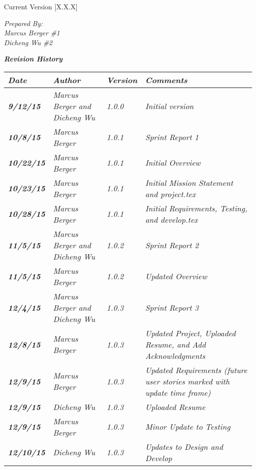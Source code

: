 


Current Version [X.X.X]
\vspace*{5mm}

{\color{SDColor5}
\noindent
\textit{Prepared By:}\\
\textit{Marcus Berger \#1}\\
\textit{Dicheng Wu \#2}\\
}

\vfill
\noindent
{\color{SDColor3} \textit{\textbf{Revision History}}}\\
\begin{tabular}{|>{\raggedright}p{1.5cm}|>{\raggedright}p{3cm}|>{\raggedright}p{1.5cm}|>{\raggedright}p{9cm}|}
\hline
\textit{\textbf{Date}} &  \textit{\textbf{Author}} & \textit{\textbf{Version}} & \textit{\textbf{Comments}}\tabularnewline
\hline
 \textit{\textbf{9/12/15}} & \textit{Marcus Berger and Dicheng Wu} & \textit{1.0.0} & \textit{Initial version}\tabularnewline
\hline
\textit{\textbf{10/8/15}} & \textit{Marcus Berger} & \textit{1.0.1} & \textit{Sprint Report 1}\tabularnewline
\hline
\textit{\textbf{10/22/15}} & \textit{Marcus Berger} & \textit{1.0.1} & \textit{Initial Overview}\tabularnewline
\hline
\textit{\textbf{10/23/15}} & \textit{Marcus Berger} & \textit{1.0.1} & \textit{Initial Mission Statement and project.tex}\tabularnewline
\hline
\textit{\textbf{10/28/15}} & \textit{Marcus Berger} & \textit{1.0.1} & \textit{Initial Requirements, Testing, and develop.tex }\tabularnewline
\hline
\textit{\textbf{11/5/15}} & \textit{Marcus Berger and Dicheng Wu} & \textit{1.0.2} & \textit{Sprint Report 2}\tabularnewline
\hline
\textit{\textbf{11/5/15}} & \textit{Marcus Berger} & \textit{1.0.2} & \textit{Updated Overview}\tabularnewline
\hline
\textit{\textbf{12/4/15}} & \textit{Marcus Berger and Dicheng Wu} & \textit{1.0.3} & \textit{Sprint Report 3}\tabularnewline
\hline
\textit{\textbf{12/8/15}} & \textit{Marcus Berger} & \textit{1.0.3} & \textit{Updated Project, Uploaded Resume, and Add Acknowledgments}\tabularnewline
\hline
\textit{\textbf{12/9/15}} & \textit{Marcus Berger} & \textit{1.0.3} & \textit{Updated Requirements (future user stories marked with update time frame) }\tabularnewline
\hline
\textit{\textbf{12/9/15}} & \textit{Dicheng Wu} & \textit{1.0.3} & \textit{Uploaded Resume}\tabularnewline
\hline
\textit{\textbf{12/9/15}} & \textit{Marcus Berger} & \textit{1.0.3} & \textit{Minor Update to Testing}\tabularnewline
\hline
\textit{\textbf{12/10/15}} & \textit{Dicheng Wu} & \textit{1.0.3} & \textit{Updates to Design and Develop}\tabularnewline

\end{tabular}
